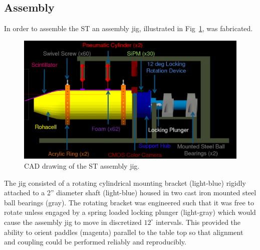 
\subsection{Assembly} \label{sec:fab_ass}

In order to assemble the ST an assembly jig, illustrated in Fig~\ref{fig:ajcaddrawing}, was fabricated.  
	\begin{figure}[!htb]
		\centering
		\includegraphics[width=1.0\columnwidth]{fabrication/figs/aj_cad_drawing}
		\caption{CAD drawing of the ST assembly jig.}
		\label{fig:ajcaddrawing}
	\end{figure}
The jig consisted of a rotating cylindrical mounting bracket (light-blue) rigidly attached to a 2'' diameter shaft (light-blue) housed in two cast iron mounted steel ball bearings (gray).  The rotating bracket was engineered such that it was free to rotate unless engaged by a spring loaded locking plunger (light-gray) which would cause the assembly jig to move in discretized $12^{\circ}$ intervals.  This provided the ability to orient paddles (magenta) parallel to the table top so that alignment and coupling could be performed reliably and reproducibly.

